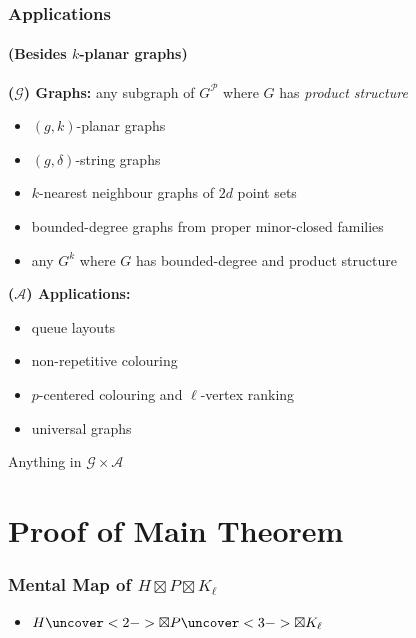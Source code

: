 \documentclass[xcolor=dvipsnames]{beamer}
\begin{document}
\begin{frame}
    \frametitle{Applications}
    \framesubtitle{(Besides $k$-planar graphs)}

    \textbf{($\mathcal{G}$) Graphs:} any subgraph of $G^\mathcal{P}$ where $G$ has \emph{product structure}
    \begin{itemize}
        \item $(g,k)$-planar graphs
        \item $(g,\delta)$-string graphs
        \item $k$-nearest neighbour graphs of $2d$ point sets
        \item bounded-degree graphs from proper minor-closed families
        \item any $G^k$ where $G$ has bounded-degree and product structure
    \end{itemize}

    \textbf{($\mathcal{A}$) Applications:}
    \begin{itemize}
        \item queue layouts
        \item non-repetitive colouring
        \item $p$-centered colouring and $\ell$-vertex ranking
        \item universal graphs
    \end{itemize}

    Anything in $\mathcal{G}\times \mathcal{A}$
\end{frame}

\section{Proof of Main Theorem}

\begin{frame}
  \frametitle{Mental Map of $H\boxtimes P\boxtimes K_{\ell}$}
  \begin{itemize}
    \item $H\uncover<2->{\boxtimes P\uncover<3->{\boxtimes K_{\ell}}}$
  \end{itemize}
  \begin{center}
  \end{center}
\end{frame}
\end{document}
